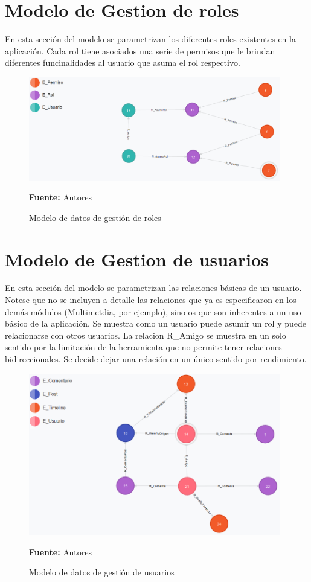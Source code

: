 \section{Modelo de Gestion de roles}

En esta sección del modelo se parametrizan los diferentes roles existentes en la aplicación. Cada rol tiene asociados una serie de permisos que le brindan diferentes funcinalidades al usuario que asuma el rol respectivo.

\begin{figure}[!htb]
  \begin{center}
    \includegraphics[width=11cm]{./imagenes/Modelo_de_datos/Roles.png}
    \caption{Modelo de datos de gestión de roles}
    \label{fig:modelo_datos_gestion_roles}
    \textbf{Fuente:}  Autores
  \end{center}
\end{figure}

\section{Modelo de Gestion de usuarios}

En esta sección del modelo se parametrizan las relaciones básicas de un usuario. Notese que no se incluyen a detalle las relaciones que ya es especificaron en los demás módulos (Multimetdia, por ejemplo), sino os que son inherentes a un uso básico de la aplicación. Se muestra como un usuario puede asumir un rol y puede relacionarse con otros usuarios. La relacion R\_Amigo se muestra en un solo sentido por la limitación de la herramienta que no permite tener relaciones bidireccionales. Se decide dejar una relación en un único sentido por rendimiento.
\begin{figure}[!htb]
  \begin{center}
    \includegraphics[width=11cm]{./imagenes/Modelo_de_datos/Usuarios.png}
    \caption{Modelo de datos de gestión de usuarios}
    \label{fig:modelo_datos_gestion_usuarios}
    \textbf{Fuente:}  Autores
  \end{center}
\end{figure}